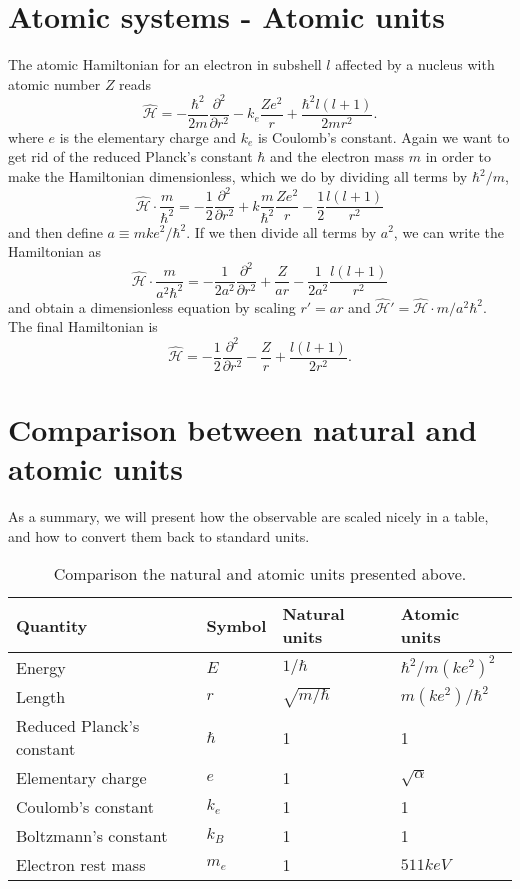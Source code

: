 \newpage
\section{Atomic systems - Atomic units}
The atomic Hamiltonian for an electron in subshell $l$ affected by a nucleus with atomic number $Z$ reads
\begin{equation}
\hat{\mathcal{H}}=-\frac{\hbar^2}{2m}\frac{\partial^2}{\partial r^2}-k_e\frac{Ze^2}{r}+\frac{\hbar^2l(l+1)}{2mr^2}.
\label{eq:HamiltonianAtomic}
\end{equation}
where $e$ is the elementary charge and $k_e$ is Coulomb's constant. Again we want to get rid of the reduced Planck's constant $\hbar$ and the electron mass $m$ in order to make the Hamiltonian dimensionless, which we do by dividing all terms by $\hbar^2/m$,
\begin{equation}
\hat{\mathcal{H}}\cdot\frac{m}{\hbar^2}=-\frac{1}{2}\frac{\partial^2}{\partial r^2}+k\frac{m}{\hbar^2}\frac{Ze^2}{r}-\frac{1}{2}\frac{l(l+1)}{r^2}
\end{equation}
and then define $a\equiv mke^2/\hbar^2$. If we then divide all terms by $a^2$, we can write the Hamiltonian as
\begin{equation}
\hat{\mathcal{H}}\cdot\frac{m}{a^2\hbar^2}=-\frac{1}{2a^2}\frac{\partial^2}{\partial r^2}+\frac{Z}{ar}-\frac{1}{2a^2}\frac{l(l+1)}{r^2}
\end{equation}
and obtain a dimensionless equation by scaling $r'=ar$ and $\hat{\mathcal{H}}'=\hat{\mathcal{H}}\cdot m/a^2\hbar^2$. The final Hamiltonian is
\begin{equation}
\hat{\mathcal{H}}=-\frac{1}{2}\frac{\partial^2}{\partial r^2}-\frac{Z}{r}+\frac{l(l+1)}{2r^2}.
\end{equation}

\section{Comparison between natural and atomic units}
As a summary, we will present how the observable are scaled nicely in a table, and how to convert them back to standard units.
\begin{table} [H]
	\caption{Comparison the natural and atomic units presented above.  \vspace{2mm}}
	\begin{tabularx}{\textwidth}{X|XXX} \hline\hline
		\label{tab:energies2P2D}
		Quantity & Symbol & Natural units & Atomic units \\ \hline
		Energy & $E$ & $1/\hbar$ & $\hbar^2/m(ke^2)^2$\\ 
		Length & $r$ & $\sqrt{m/\hbar}$ & $m(ke^2)/\hbar^2$\\
		Reduced Planck's constant & $\hbar$ & 1 & 1 \\
		Elementary charge & $e$ & 1 & $\sqrt{\alpha}$ \\
		Coulomb's constant & $k_e$ & 1 & 1 \\
		Boltzmann's constant & $k_B$ & 1 & 1 \\
		Electron rest mass & $m_e$ & 1 & $511 keV$ \\ \hline\hline
	\end{tabularx}
\end{table}

